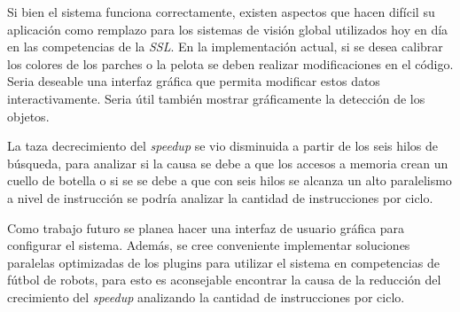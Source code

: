 \label{trabajosFuturos}

Si bien el sistema funciona correctamente, existen aspectos que hacen difícil su
aplicación como remplazo para los sistemas de visión global utilizados hoy en
día en las competencias de la \emph{SSL}. En la implementación actual, si se
desea calibrar los colores de los parches o la pelota se deben realizar
modificaciones en el código. Seria deseable una interfaz gráfica que permita
modificar estos datos interactivamente. Seria útil también mostrar gráficamente
la detección de los objetos.

La taza decrecimiento del \emph{speedup} se vio disminuida a partir de los seis
hilos de búsqueda, para analizar si la causa se debe a que los accesos a memoria
crean un cuello de botella o si se se debe a que con seis hilos se alcanza un
alto paralelismo a nivel de instrucción se podría analizar la cantidad de
instrucciones por ciclo.

Como trabajo futuro se planea hacer una interfaz de usuario gráfica para
configurar el sistema. Además, se cree conveniente implementar soluciones
paralelas optimizadas de los plugins para utilizar el sistema en competencias de
fútbol de robots, para esto es aconsejable encontrar la causa de la reducción
del crecimiento del \emph{speedup} analizando la cantidad de instrucciones por
ciclo.

